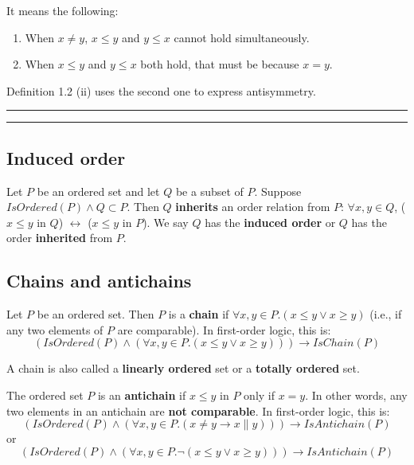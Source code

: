 \documentclass[12pt, letterpaper, oneside]{book}
\begin{document}
It means the following:
\begin{enumerate}
  \item When $x \ne y$, $x \leqslant y$ and $y \leqslant x$ cannot hold simultaneously.
  \item When $x \leqslant y$ and $y \leqslant x$ both hold, that must be because $x = y$.
\end{enumerate}

Definition 1.2 (ii) uses the second one to express antisymmetry.

\noindent\rule{10cm}{0.4pt}\rule{1cm}{10pt}

\subsection{Induced order}

Let $P$ be an ordered set and let $Q$ be a subset of $P$.
Suppose $IsOrdered(P) \land Q \subset P$. Then $Q$ \textbf{inherits} an order relation from $P$: $\forall x, y \in Q$,
($x \leqslant y$ in $Q$) $\leftrightarrow$ ($x \leqslant y$ in $P$). We say $Q$ has the \textbf{induced order} or $Q$
has the order \textbf{inherited} from $P$.

\subsection{Chains and antichains}

Let $P$ be an ordered set. Then $P$ is a \textbf{chain} if $\forall x, y \in P. (x \leqslant y \lor x \geqslant y)$
(i.e., if any two elements of $P$ are comparable). In first-order logic, this is:
\[ (IsOrdered(P) \land (\forall x, y \in P. (x \leqslant y \lor x \geqslant y))) \rightarrow IsChain(P) \]

A chain is also called a \textbf{linearly ordered} set or a \textbf{totally ordered} set.

The ordered set $P$ is an \textbf{antichain} if $x \leqslant y$ in $P$ only if $x = y$. In other words, any two elements
in an antichain are \textbf{not comparable}. In first-order logic, this is:
\[ (IsOrdered(P) \land (\forall x, y \in P. (x \ne y \rightarrow x \parallel y))) \rightarrow IsAntichain(P) \]
or
\[ (IsOrdered(P) \land (\forall x, y \in P. \lnot(x \leqslant y \lor x \geqslant y))) \rightarrow IsAntichain(P) \]
\end{document}
